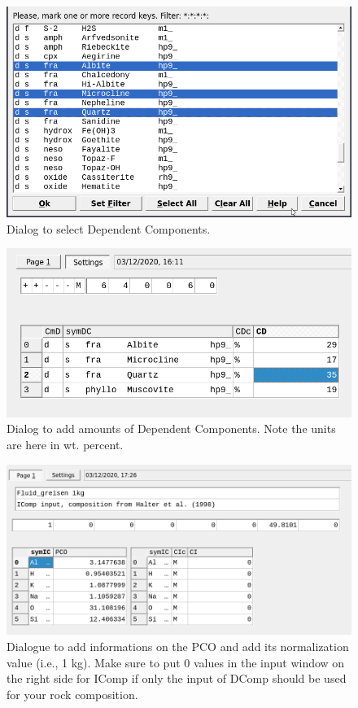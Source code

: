 \documentclass[
]{book}
\begin{document}
\begin{figure}
\includegraphics[width=0.9\linewidth]{figures/module3/fig-4} \caption{Dialog to select Dependent Components.}\label{fig:fig-4c}
\end{figure}
\begin{figure}
\includegraphics[width=0.9\linewidth]{figures/module3/fig-5} \caption{Dialog to add amounts of Dependent Components. Note the units are here in wt. percent.}\label{fig:fig-5c}
\end{figure}

\begin{figure}
\includegraphics[width=0.9\linewidth]{figures/module3/fig-6} \caption{Dialogue to add informations on the PCO and add its normalization value (i.e., 1 kg). Make sure to put 0 values in the input window on the right side for IComp if only the input of DComp should be used for your rock composition.}\label{fig:fig-6c}
\end{figure}
\end{document}
